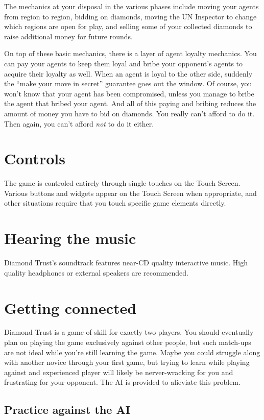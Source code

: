\documentclass[8pt]{extbook}
\begin{document}
The mechanics at your disposal in the various phases include moving your agents from region to region, bidding on diamonds, moving the UN Inspector to change which regions are open for play, and selling some of your collected diamonds to raise additional money for future rounds.

On top of these basic mechanics, there is a layer of agent loyalty mechanics.  You can pay your agents to keep them loyal and bribe your opponent's agents to acquire their loyalty as well.  When an agent is loyal to the other side, suddenly the ``make your move in secret'' guarantee goes out the window.  Of course, you won't know that your agent has been compromised, unless you manage to bribe the agent that bribed your agent.  And all of this paying and bribing reduces the amount of money you have to bid on diamonds.  You really can't afford to do it.  Then again, you can't afford {\it not} to do it either.

\section{Controls}
The game is controled entirely through single touches on the Touch Screen.  Various buttons and widgets appear on the Touch Screen when appropriate, and other situations require that you touch specific game elements directly.

\section{Hearing the music}

Diamond Trust's soundtrack features near-CD quality interactive music.  High quality headphones or external speakers are recommended.

\section{Getting connected}

Diamond Trust is a game of skill for exactly two players.  You should eventually plan on playing the game exclusively against other people, but such match-ups are not ideal while you're still learning the game.  Maybe you could struggle along with another novice through your first game, but trying to learn while playing against and experienced player will likely be nerver-wracking for you and frustrating for your opponent.  The AI is provided to alieviate this problem.

\subsection{Practice against the AI}
\end{document}
